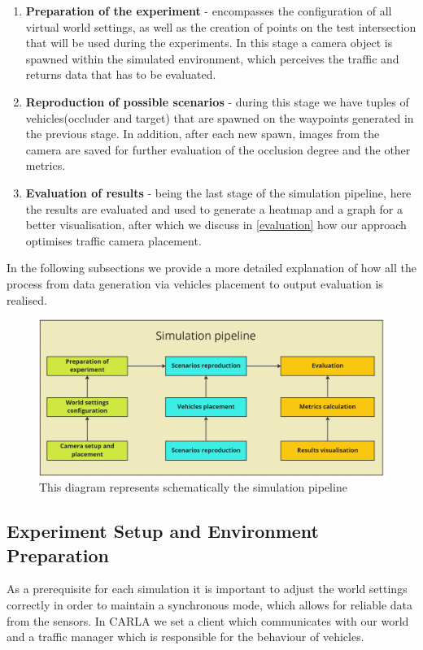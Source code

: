 \begin{enumerate}
    \item \textbf{Preparation of the experiment} - encompasses the configuration of all virtual world settings, as well as the creation of points on the test intersection that will be used during the experiments. In this stage a camera object is spawned within the simulated environment, which perceives the traffic and returns data that has to be evaluated. 
    \item \textbf{Reproduction of possible scenarios} - during this stage we have tuples of vehicles(occluder and target) that are spawned on the waypoints generated in the previous stage. In addition, after each new spawn, images from the camera are saved for further evaluation of the occlusion degree and the other metrics.
    \item \textbf{Evaluation of results} - being the last stage of the simulation pipeline, here the results are evaluated and used to generate a heatmap and a graph for a better visualisation, after which we discuss in \ref{evaluation} how our approach optimises traffic camera placement.
\end{enumerate}
In the following subsections we provide a more detailed explanation of how all the process from data generation via vehicles placement to output evaluation is realised.
\begin{figure} [h]
    \centering
    \includegraphics[width=\textwidth]{images/evaluation_pipeline.png}
    \caption[Evaluation pipeline]{This diagram represents schematically the simulation pipeline}
    \label{fig:evaluation_pipeline}
\end{figure}

\subsection{Experiment Setup and Environment Preparation}
As a prerequisite for each simulation it is important to adjust the world settings correctly in order to maintain a synchronous mode, which allows for reliable data from the sensors. In CARLA we set a client which communicates with our world and a traffic manager which is responsible for the behaviour of vehicles. 

